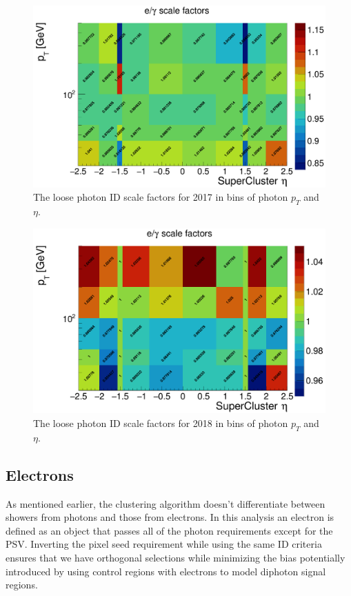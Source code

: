 \begin{figure}[h]
	\centering
	\includegraphics[width=0.9\linewidth]{Figures/LoosePhotonSF_2017}
	\caption[Scale factors fo 2017 loose photon ID.]{The loose photon ID scale factors for 2017 in bins of photon $p_T$ and $\eta$.}
	\label{fig:loosephotonsf2017}
\end{figure}

\begin{figure}[h]
	\centering
	\includegraphics[width=0.9\linewidth]{Figures/LoosePhotonSF_2018}
	\caption[Scale factors for 2018 loose photon ID.]{The loose photon ID scale factors for 2018 in bins of photon $p_T$ and $\eta$.}
	\label{fig:loosephotonsf2018}
\end{figure}


\label{section:photondefinition}

\subsection{Electrons}
As mentioned earlier, the clustering algorithm doesn't differentiate between showers from photons and those from electrons.  In this analysis an electron is defined as an object that passes all of the photon requirements except for the PSV.  Inverting the pixel seed requirement while using the same ID criteria ensures that we have orthogonal selections while minimizing the bias potentially introduced by using control regions with electrons to model diphoton signal regions. 


